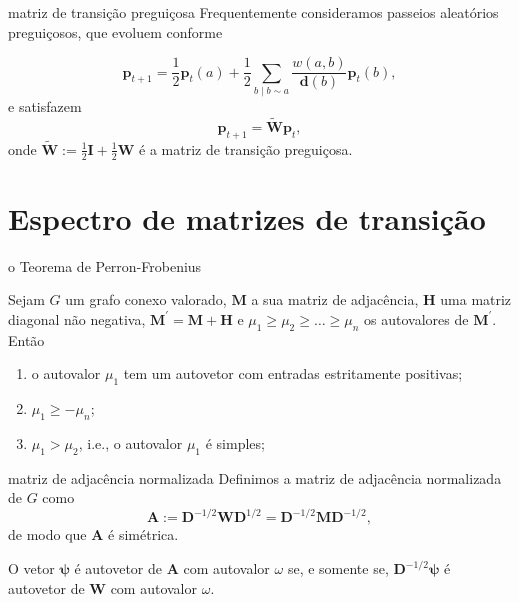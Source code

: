 \documentclass{beamer}
\begin{document}
\begin{frame}{matriz de transição preguiçosa}
    Frequentemente consideramos \alert{passeios aleatórios preguiçosos}, que evoluem conforme

    \begin{equation}
        \mathbf{p}_{t+1} = \frac{1}{2}\mathbf{p}_t(a) + \frac{1}{2}\sum_{b \mid b \sim a} \frac{w(a, b)}{\mathbf{d}(b)} \mathbf{p}_t(b),
    \end{equation} e satisfazem
    \begin{equation}
        \mathbf{p}_{t+1} = \widetilde{\mathbf{W}} \mathbf{p}_t,
    \end{equation} onde \(\widetilde{\mathbf{W}} := \frac{1}{2}\mathbf{I} + \frac{1}{2}\mathbf{W}\) é a \alert{matriz de transição preguiçosa}.
\end{frame}

\section{Espectro de matrizes de transição}

\begin{frame}{o Teorema de Perron-Frobenius}
    \begin{thm}
        Sejam \(G\) um grafo conexo valorado, \(\mathbf{M}\) a sua matriz de adjacência, \(\mathbf{H}\) uma matriz diagonal não negativa, \(\mathbf{M}^{\prime} = \mathbf{M} + \mathbf{H}\) e \(\mu_1 \geq \mu_2 \geq \ldots \geq \mu_n\) os autovalores de \(\mathbf{M}^{\prime}\). Então
        \begin{enumerate}
            \item o autovalor \(\mu_1\) tem um autovetor com entradas estritamente positivas;
            \item \(\mu_1 \geq -\mu_n\);
            \item \(\mu_1 > \mu_2\), i.e., o autovalor \(\mu_1\) é simples;
        \end{enumerate}
    \end{thm}
\end{frame}

\begin{frame}{matriz de adjacência normalizada}
    Definimos a \alert{matriz de adjacência normalizada} de \(G\) como
    \begin{equation}
        \mathbf{A} := \mathbf{D}^{-1/2} \mathbf{W} \mathbf{D}^{1/2} = \mathbf{D}^{-1/2} \mathbf{M} \mathbf{D}^{-1/2},
    \end{equation} de modo que \(\mathbf{A}\) é simétrica.

    \begin{prop}
        O vetor \(\mathbf{\psi}\) é autovetor de \(\mathbf{A}\) com autovalor \(\omega\) se, e somente se, \(\mathbf{D}^{-1/2}\mathbf{\psi}\) é autovetor de \(\mathbf{W}\) com autovalor \(\omega\).
    \end{prop}
\end{frame}
\end{document}
